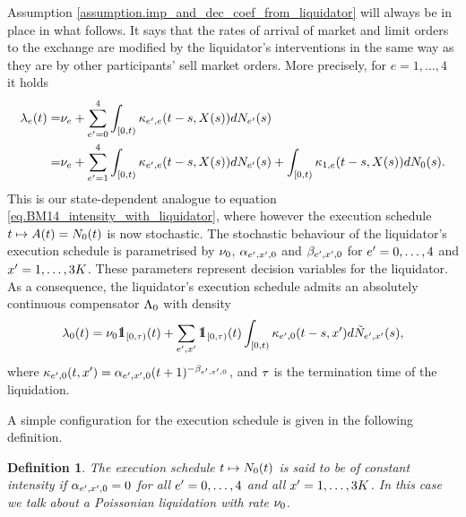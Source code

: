 \documentclass[10pt, article,table]{article}
\newtheorem{defi}[thm]{Definition}
\begin{document}
Assumption \ref{assumption.imp_and_dec_coef_from_liquidator} will always be in place in what follows. It says that the rates of arrival of market and limit orders to the exchange are modified by the liquidator's interventions in the same way as they are by other participants' sell market orders. More precisely, for $e=1,\dots,4$ it holds 
\begin{equation}\label{eq.intensities_when_liquidator_is_present}
\begin{split}
\intensity[e](t) =& \baseRate_e 
 + \sum_{\eone = 0}^{4}\int_{[0,t)} \hawkesKernel_{\eone,e}(t-s,\stateVariable(s))d\countingProc[\eone](s)
 \\
 =& \baseRate_e 
 + \sum_{\eone = 1}^{4}\int_{[0,t)} \hawkesKernel_{\eone,e}(t-s,\stateVariable(s))d\countingProc[\eone](s)
 + \int_{[0,t)} \hawkesKernel_{1,e}(t-s,\stateVariable(s))d\countingProc[0](s).
 \end{split}
\end{equation}
This is our state-dependent analogue to equation \eqref{eq.BM14_intensity_with_liquidator}, where however the execution schedule $t \mapsto A(t)=\countingProc[0](t)$ is now stochastic. The stochastic behaviour of the liquidator's execution schedule is parametrised by $\baseRate_0$, $\impCoef_{\eone,\xone,0}$ and $\decCoef_{\eone,\xone,0}$ for $\eone = 0,\dots,4$ and $\xone=1,\dots,3K$. These parameters represent decision variables for the liquidator. As a consequence, the liquidator's execution schedule admits an absolutely continuous compensator $\compensator_{0}$ with density 
\begin{equation}\label{eq.intensity_of_liquidator}
 \intensity[0](t)
 =
 \baseRate_0 \one_{[0,\terminationTime)}(t) + 
 \sum_{\eone,\xone}\one_{[0,\terminationTime)}(t)
 \int_{[0,t)} \hawkesKernel_{\eone,0} (t-s,\xone) d\hybridHawkes_{\eone,\xone}(s),
\end{equation}
where $\hawkesKernel_{\eone,0}(t,\xone) = \impCoef_{\eone,\xone,0}(t+1)^{-\decCoef_{\eone,\xone,0}}$, and $\terminationTime$ is the termination time of the liquidation. 

A simple configuration for the execution schedule is given in the following definition. 
\begin{defi}\label{def.poissonina_liquidation}
The execution schedule $t \mapsto \countingProc[0](t)$ is said to be of constant intensity if $\impCoef_{\eone,\xone,0} = 0$ for all $\eone = 0,\dots,4$ and all $\xone=1,\dots,3K$. In this case we talk about a Poissonian liquidation with rate $\baseRate_0$. 
\end{defi}
\end{document}
